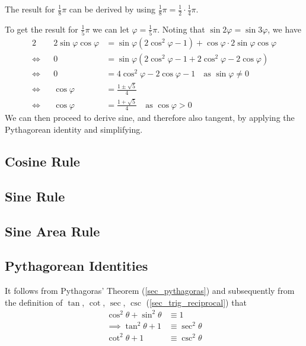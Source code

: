 The result for \(\frac 18 \pi\) can be derived by using
\(\frac 18 \pi = \frac 12 \cdot \frac 14 \pi\).

To get the result for \(\frac 15 \pi\) we can let
\(\varphi = \frac 15 \pi\).  Noting that
\(\sin 2\varphi = \sin 3\varphi\), we have
\begin{alignat*}2
 && 2\sin \varphi \cos \varphi
     &= \sin \varphi (2\cos^2 \varphi - 1)
     + \cos \varphi \cdot 2\sin \varphi \cos \varphi \\
 \iff{}&& 0 &= \sin \varphi (2\cos^2 \varphi - 1
                         + 2\cos^2 \varphi - 2\cos \varphi) \\
 \iff{}&& 0 &= 4\cos^2 \varphi - 2\cos \varphi - 1
     \quad \text{as \(\sin \varphi \ne 0\)} \\
 \iff{}&& \cos \varphi &= \frac{1 \pm \sqrt 5} 4 \\
 \iff{}&& \cos \varphi &= \frac{1 + \sqrt 5} 4
     \quad \text{as \(\cos \varphi > 0\)}
\end{alignat*}
We can then proceed to derive sine, and therefore also tangent, by applying
the Pythagorean identity and simplifying.

\subsection{Cosine Rule}

\subsection{Sine Rule}

\subsection{Sine Area Rule}

\subsection{Pythagorean Identities} \label{sec_trig_pythag}

It follows from Pythagoras' Theorem (\ref{sec_pythagoras})
and subsequently from the definition of
\(\tan\), \(\cot\), \(\sec\), \(\csc\) (\ref{sec_trig_reciprocal}) that
\begin{align*}
 \cos^2 \theta + \sin^2 \theta &\equiv 1 \\
 \implies \tan^2 \theta + 1 &\equiv \sec^2 \theta \\
 \cot^2 \theta + 1 &\equiv \csc^2 \theta
\end{align*}

